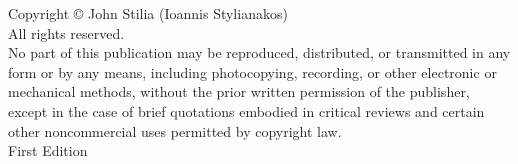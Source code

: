 \thispagestyle{empty}

\begin{center}
\vspace*{\fill}

{\small
Copyright © \the\year{} John Stilia (Ioannis Stylianakos)\\[0.5cm]
All rights reserved.\\[0.5cm]

No part of this publication may be reproduced, distributed, or transmitted in any form or by any means,
including photocopying, recording, or other electronic or mechanical methods, without the prior written
permission of the publisher, except in the case of brief quotations embodied in critical reviews and
certain other noncommercial uses permitted by copyright law.\\[0.5cm]

First Edition\\[0.5cm]

}

\vspace*{\fill}
\end{center}

\clearpage  %